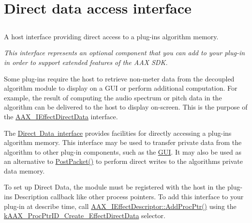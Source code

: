 \hypertarget{a00803}{}\section{Direct data access interface}
\label{a00803}


\subsection{ }
A host interface providing direct access to a plug-\/in\textquotesingle{}s algorithm memory. 

{\itshape This interface represents an optional component that you can add to your plug-\/in in order to support extended features of the A\+AX S\+DK.}

Some plug-\/ins require the host to retrieve non-\/meter data from the decoupled algorithm module to display on a G\+UI or perform additional computation. For example, the result of computing the audio spectrum or pitch data in the algorithm can be delivered to the host to display on-\/screen. This is the purpose of the \mbox{\hyperlink{a01817}{A\+A\+X\+\_\+\+I\+Effect\+Direct\+Data}} interface.

The \mbox{\hyperlink{a01817}{Direct Data interface}} provides facilities for directly accessing a plug-\/in\textquotesingle{}s algorithm memory. This interface may be used to transfer private data from the algorithm to other plug-\/in components, such as the \mbox{\hyperlink{a00799}{G\+UI}}. It may also be used as an alternative to \mbox{\hyperlink{a01789_ae5dd2b5925dbc181513bca1c4ac5e716}{Post\+Packet()}} to perform direct writes to the algorithm\textquotesingle{}s private data memory.

To set up Direct Data, the module must be registered with the host in the plug-\/in\textquotesingle{}s Description callback like other process pointers. To add this interface to your plug-\/in at describe time, call \mbox{\hyperlink{a01813_ad1a286ef7cb869e6f79423dd774ec976}{A\+A\+X\+\_\+\+I\+Effect\+Descriptor\+::\+Add\+Proc\+Ptr()}} using the \mbox{\hyperlink{a00401_af0682195d377392ad356fd2b00c36892a2d3621474e9eeeda84309dad0a4d8d8e}{k\+A\+A\+X\+\_\+\+Proc\+Ptr\+I\+D\+\_\+\+Create\+\_\+\+Effect\+Direct\+Data}} selector.

